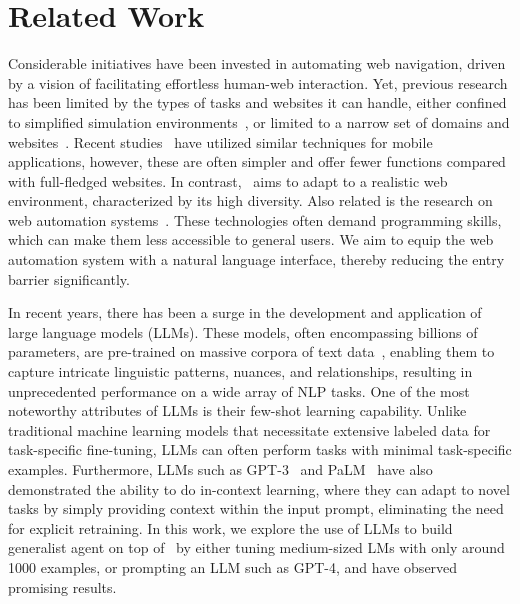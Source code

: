 \section{Related Work}
\begin{remark} 
Considerable initiatives have been invested in automating web navigation, driven by a vision of facilitating effortless human-web interaction.
Yet, previous research has been limited by the types of tasks and websites it can handle, either confined to simplified simulation environments~\cite{shiWorldBitsOpenDomain2017, Liu2018ReinforcementLO, yaoWebShopScalableRealWorld2022}, or limited to a narrow set of domains and websites~\cite{yaoWebShopScalableRealWorld2022, Xu2021GroundingOI}.
Recent studies~\cite{sunMETAGUIMultimodalConversational2022, Burns2022ADF, Li2020MappingNL} have utilized similar techniques for mobile applications, however, these are often simpler and offer fewer functions compared with full-fledged websites.
In contrast, \mind\ aims to adapt to a realistic web environment, characterized by its high diversity.
Also related is the research on web automation systems~\cite{leshedCoScripterAutomatingSharing2008, puppeteer}.
These technologies often demand programming skills, which can make them less accessible to general users. We aim to equip the web automation system with a natural language interface, thereby reducing the entry barrier significantly.
\end{remark}

\begin{remark} 
In recent years, there has been a surge in the development and application of large language models (LLMs). These models, often encompassing billions of parameters, are pre-trained on massive corpora of text data~\cite{Zhou2023ACS, LLMSurvey, Bommasani2021FoundationModels}, enabling them to capture intricate linguistic patterns, nuances, and relationships, resulting in unprecedented performance on a wide array of NLP tasks.
One of the most noteworthy attributes of LLMs is their few-shot learning capability. Unlike traditional machine learning models that necessitate extensive labeled data for task-specific fine-tuning, LLMs can often perform tasks with minimal task-specific examples. Furthermore, LLMs such as GPT-3~\cite{brownLanguageModelsAre2020} and PaLM~\cite{chowdhery2022palm} have also demonstrated the ability to do in-context learning, where they can adapt to novel tasks by simply providing context within the input prompt, eliminating the need for explicit retraining.
In this work, we explore the use of LLMs to build generalist agent on top of \mind\ by either tuning medium-sized LMs with only around \num{1000} examples, or prompting an LLM such as GPT-4, and have observed promising results.

\end{remark}

